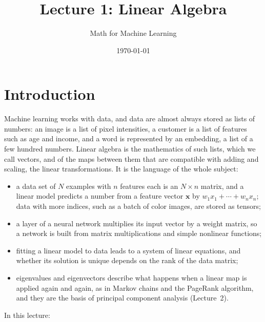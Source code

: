 \documentclass[11pt]{article}
\title{Lecture 1: Linear Algebra}
\author{Math for Machine Learning}
\date{\today}
\theoremstyle{definition}
\theoremstyle{plain}
\theoremstyle{remark}
\begin{document}
\maketitle
\tableofcontents

\section*{Introduction}

Machine learning works with data, and data are almost always stored as lists of numbers: an image is a list of pixel intensities, a customer is a list of features such as age and income, and a word is represented by an embedding, a list of a few hundred numbers. Linear algebra is the mathematics of such lists, which we call vectors, and of the maps between them that are compatible with adding and scaling, the linear transformations. It is the language of the whole subject:
\begin{itemize}
    \item a data set of $N$ examples with $n$ features each is an $N \times n$ matrix, and a linear model predicts a number from a feature vector $\mathbf{x}$ by $w_1x_1 + \cdots + w_nx_n$; data with more indices, such as a batch of color images, are stored as tensors;
    \item a layer of a neural network multiplies its input vector by a weight matrix, so a network is built from matrix multiplications and simple nonlinear functions;
    \item fitting a linear model to data leads to a system of linear equations, and whether its solution is unique depends on the rank of the data matrix;
    \item eigenvalues and eigenvectors describe what happens when a linear map is applied again and again, as in Markov chains and the PageRank algorithm, and they are the basis of principal component analysis (Lecture~2).
\end{itemize}
In this lecture:
\end{document}
